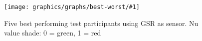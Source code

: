 \newcommand{\graphtheshit}[3]{
    \begin{figure}[h!]
    \begin{minipage}[t]{0.5\textwidth}
        \texttt{[image: graphics/graphs/best-worst/\#1]}
        \caption{#2}
        \label{#3}
    \end{minipage}
    \end{figure}
}

\newcommand{\somethingsomething}{
  \graphtheshit{best-False_cover_rate_(FCR)-Events_hit_rate_(EHR)-CovNu-GSR.pdf}
  {Five best performing test participants using GSR as sensor. Nu value shade: 0 = green, 1 = red}{fig:best_five_gsr}
}

\somethingsomething